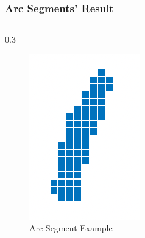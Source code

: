 \documentclass{beamer}
\begin{document}
    \begin{frame}
        \frametitle{Arc Segments' Result}
    
        \begin{columns}
            \begin{column}
                {0.3\linewidth}
                \begin{figure}
                    \includegraphics[width=\linewidth]{pic/arc.png}
                    \caption{Arc Segment Example}
                \end{figure}
            \end{column}


\end{columns}
\end{frame}
\end{document}
